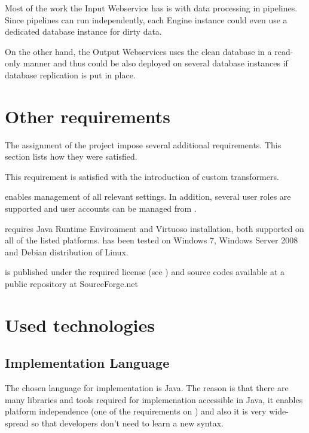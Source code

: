  Most of the work the Input Webservice has is with data processing in pipelines. Since pipelines can run independently, each Engine instance could even use a dedicated database instance for dirty data.

 On the other hand, the Output Webservices uses the clean database in a read-only manner and thus could be also deployed on several database instances if database replication is put in place.

\section{Other requirements}
The assignment of the project impose several additional requirements. This section lists how they were satisfied.

 This requirement is satisfied with the introduction of custom transformers.

 \FE enables management of all relevant settings. In addition, several user roles are supported and user accounts can be managed from \FE.

 \odcs requires Java Runtime Environment and Virtuoso installation, both supported on all of the listed platforms. \odcs has been tested on Windows 7, Windows Server 2008 and Debian distribution of Linux.

 \odcs is published under the required license (see ) and source codes available at a public repository at SourceForge.net

\section{Used technologies}

\subsection{Implementation Language}
The chosen language for implementation is Java. The reason is that there are many libraries and tools required for implemenation accessible in Java, it enables platform independence (one of the requirements on \odcs) and also it is very wide-spread so that developers don't need to learn a new syntax.

